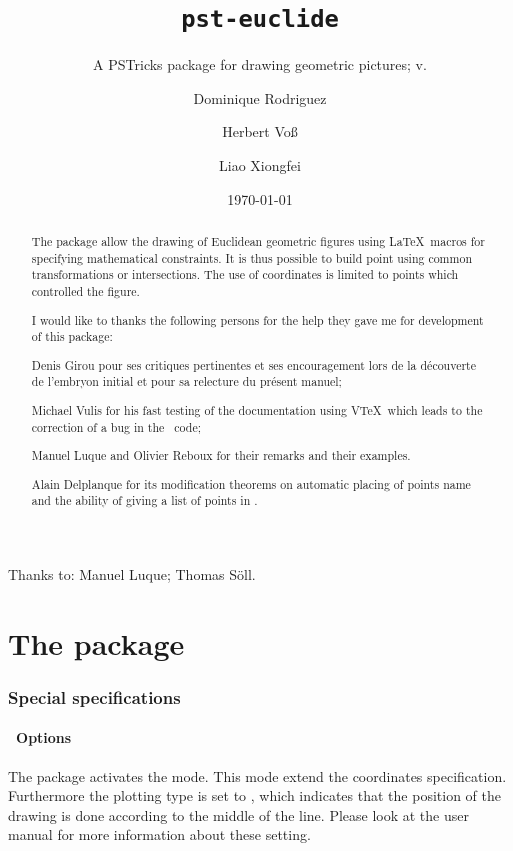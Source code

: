 \documentclass[11pt,english,BCOR=10mm,DIV=12,bibliography=totoc,parskip=false,headings=small,
    headinclude=false,footinclude=false,twoside,english]{pst-doc}
\title{\texttt{pst-euclide}}
\subtitle{A PSTricks package for drawing geometric pictures; v.\pstEuclideFV}
\author{Dominique Rodriguez\and Herbert Voß\and Liao Xiongfei}
\date{\today}
\begin{document}
\maketitle

\begin{abstract}
  The  package allow the drawing of Euclidean
  geometric figures using \LaTeX\ macros for specifying mathematical
  constraints. It is thus possible to build point using common
  transformations or intersections. The use of coordinates is limited
  to points which controlled the figure.

  \vfill
  I would like to thanks the following persons for the help they gave
  me for development of this package:

  \begin{compactitem}
  \item Denis Girou pour ses critiques pertinentes et ses
    encouragement lors de la découverte de l'embryon initial et pour
    sa relecture du présent manuel;
  \item Michael Vulis for his fast testing of the documentation using
    V\TeX\ which leads to the correction of a bug in the \PS\ code;
  \item Manuel Luque and Olivier Reboux for their remarks and their examples.
  \item Alain Delplanque for its modification theorems on automatic
    placing of points name and the ability of giving a list of points in
    .
  \end{compactitem}
\end{abstract}


\vfill
\noindent
Thanks to:
Manuel Luque;
Thomas Söll.




\clearpage
\tableofcontents


\clearpage
\part{The package}
\section{Special specifications}

\subsection{\PST\ Options}

The package activates the  mode. This mode extend the
coordinates specification. Furthermore the plotting type is set to
, which indicates that the position of the
drawing is done according to the middle of the line. Please look at
the user manual for more information about these setting.
\end{document}
